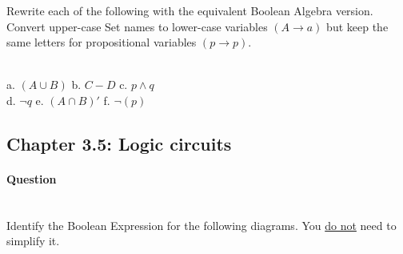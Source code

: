 \documentclass[a4paper,12pt]{book} \usepackage[utf8]{inputenc} \title{} \author{Rachel Morris} \date{\today}
\newcounter{question}
\begin{document}
        Rewrite each of the following with the equivalent Boolean Algebra version.
        Convert upper-case Set names to lower-case variables $(A \to a)$ but
        keep the same letters for propositional variables $(p \to p)$.

            ~\\
            a. $(A \cup B)$     \tab
            b. $C - D$          \tab
            c. $p \land q$      \\
            d. $\neg q$         \tab[1.8cm] 
            e. $(A \cap B)'$    \tab[0.6cm]
            f. $\neg(p)$



\subsection*{Chapter 3.5: Logic circuits}

    \paragraph{Question \thequestion} ~\\

        Identify the Boolean Expression for the following diagrams.
        You \underline{do not} need to simplify it.
\end{document}
